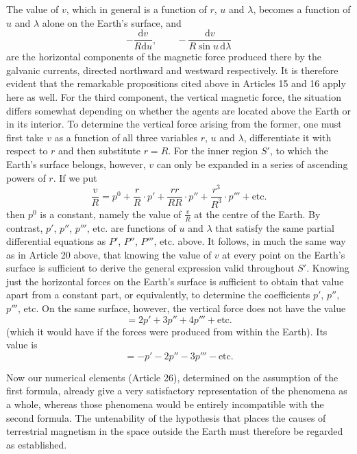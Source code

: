 The value of $v$, which in general is a function of $r$, $u$ and $\lambda$, becomes a function of $u$ and $\lambda$ alone on the Earth's surface, and
\[
-\frac{\mathrm dv}{R\mathrm du},\qquad -\frac{\mathrm dv}{R\sin u\,\mathrm d\lambda}
\]
are the horizontal components of the magnetic force produced there by the galvanic currents, directed northward and westward respectively. It is therefore evident that the remarkable propositions cited above in Articles 15 and 16 apply here as well. For the third component, the vertical magnetic force, the situation differs somewhat depending on whether the agents are located above the Earth or in its interior. To determine the vertical force arising from the former, one must first take $v$ as a function of all three variables $r$, $u$ and $\lambda$, differentiate it with respect to $r$ and then substitute $r=R$. For the inner region $S'$, to which the Earth's surface belongs, however, $v$ can only be expanded in a series of ascending powers of $r$. If we put
\[
\frac vR=p^0+\frac rR\cdot p'+\frac{rr}{RR}\cdot p''+\frac{r^3}{R^3}\cdot p'''+\text{etc.}
\]
then $p^0$ is a constant, namely the value of $\frac vR$ at the centre of the
Earth. By contrast, $p'$, $p''$, $p'''$, etc. are functions of $u$ and $\lambda$ that satisfy the same partial differential equations as $P'$, $P''$, $P'''$, etc. above. It follows, in much the same way as in Article 20 above, that knowing the value of $v$ at every point on the Earth's surface is sufficient to derive the general expression valid throughout $S'$. Knowing just the horizontal forces on the Earth's surface is sufficient to obtain that value apart from a constant part, or equivalently, to determine the coefficients $p'$, $p''$, $p'''$, etc. On the same surface, however, the vertical force does not have the value
\[
=2p'+3p''+4p'''+\text{etc.}
\]
(which it would have if the forces were produced from within the Earth). Its value is
\[
=-p'-2p''-3p'''-\text{etc.}
\]

Now our numerical elements (Article 26), determined on the assumption of the first formula, already give a very satisfactory representation of the phenomena as a whole, whereas those phenomena would be entirely incompatible with the second formula. The untenability of the hypothesis that places the causes of terrestrial magnetism in the space outside the Earth must therefore be regarded as established.

